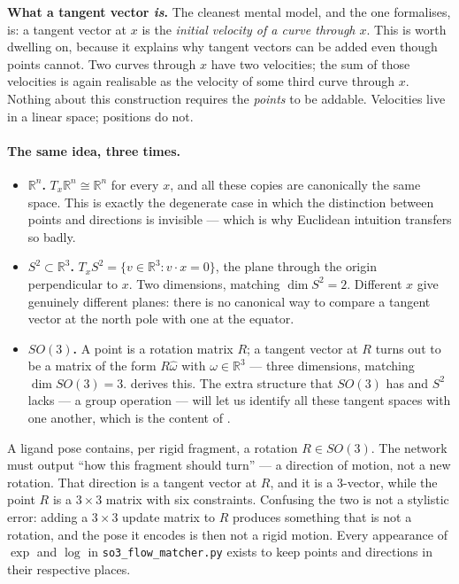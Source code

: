 \documentclass[11pt,a4paper]{report}
\theoremstyle{definition}
\theoremstyle{remark}
\newcommand{\RR}{\mathbb R}
\newcommand{\file}[1]{\texttt{#1}}
\begin{document}
\textbf{What a tangent vector \emph{is}.} The cleanest mental model, and the
one  formalises, is: a tangent vector at $x$ is the
\emph{initial velocity of a curve through $x$}. This is worth dwelling on,
because it explains why tangent vectors can be added even though points
cannot. Two curves through $x$ have two velocities; the sum of those
velocities is again realisable as the velocity of some third curve through
$x$. Nothing about this construction requires the \emph{points} to be
addable. Velocities live in a linear space; positions do not.

\paragraph{The same idea, three times.}
\begin{itemize}
\item \textbf{$\RR^n$.} $T_x\RR^n\cong\RR^n$ for every $x$, and all these
copies are canonically the same space. This is exactly the degenerate case in
which the distinction between points and directions is invisible --- which is
why Euclidean intuition transfers so badly.
\item \textbf{$S^2\subset\RR^3$.} $T_xS^2=\{v\in\RR^3: v\cdot x=0\}$, the
plane through the origin perpendicular to $x$. Two dimensions, matching
$\dim S^2=2$. Different $x$ give genuinely different planes: there is no
canonical way to compare a tangent vector at the north pole with one at the
equator.
\item \textbf{$SO(3)$.} A point is a rotation matrix $R$; a tangent vector at
$R$ turns out to be a matrix of the form $R\widehat\omega$ with
$\omega\in\RR^3$ --- three dimensions, matching $\dim SO(3)=3$.
 derives this. The extra structure that $SO(3)$ has and
$S^2$ lacks --- a group operation --- will let us identify all these tangent
spaces with one another, which is the content of
.
\end{itemize}

\begin{tcolorbox}[colback=blue!3,colframe=blue!40!black,title=Why this matters for SigmaFlow]
A ligand pose contains, per rigid fragment, a rotation $R\in SO(3)$. The
network must output ``how this fragment should turn'' --- a direction of
motion, not a new rotation. That direction is a tangent vector at $R$, and
it is a $3$-vector, while the point $R$ is a $3\times3$ matrix with six
constraints. Confusing the two is not a stylistic error: adding a
$3\times3$ update matrix to $R$ produces something that is not a rotation,
and the pose it encodes is then not a rigid motion. Every appearance of
$\exp$ and $\log$ in \file{so3\_flow\_matcher.py} exists to keep points and
directions in their respective places.
\end{tcolorbox}
\end{document}
